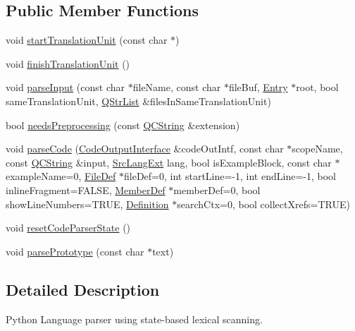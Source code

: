 \subsection*{Public Member Functions}
\begin{DoxyCompactItemize}
\item 
void \mbox{\hyperlink{class_python_language_scanner_ae67929ac5a3d38fc925157f7a5f43497}{start\+Translation\+Unit}} (const char $\ast$)
\item 
void \mbox{\hyperlink{class_python_language_scanner_a97ca623055615c143e63ea98be819f86}{finish\+Translation\+Unit}} ()
\item 
void \mbox{\hyperlink{class_python_language_scanner_a6848c585fe2a19cd36ed34540dc3fdce}{parse\+Input}} (const char $\ast$file\+Name, const char $\ast$file\+Buf, \mbox{\hyperlink{class_entry}{Entry}} $\ast$root, bool same\+Translation\+Unit, \mbox{\hyperlink{class_q_str_list}{Q\+Str\+List}} \&files\+In\+Same\+Translation\+Unit)
\item 
bool \mbox{\hyperlink{class_python_language_scanner_a7c6ce0a95e477374182374a9f5bb2e2f}{needs\+Preprocessing}} (const \mbox{\hyperlink{class_q_c_string}{Q\+C\+String}} \&extension)
\item 
void \mbox{\hyperlink{class_python_language_scanner_a0920a8f0a1fc295f0e9c240aee99012c}{parse\+Code}} (\mbox{\hyperlink{class_code_output_interface}{Code\+Output\+Interface}} \&code\+Out\+Intf, const char $\ast$scope\+Name, const \mbox{\hyperlink{class_q_c_string}{Q\+C\+String}} \&input, \mbox{\hyperlink{types_8h_a9974623ce72fc23df5d64426b9178bf2}{Src\+Lang\+Ext}} lang, bool is\+Example\+Block, const char $\ast$example\+Name=0, \mbox{\hyperlink{class_file_def}{File\+Def}} $\ast$file\+Def=0, int start\+Line=-\/1, int end\+Line=-\/1, bool inline\+Fragment=F\+A\+L\+SE, \mbox{\hyperlink{class_member_def}{Member\+Def}} $\ast$member\+Def=0, bool show\+Line\+Numbers=T\+R\+UE, \mbox{\hyperlink{class_definition}{Definition}} $\ast$search\+Ctx=0, bool collect\+Xrefs=T\+R\+UE)
\item 
void \mbox{\hyperlink{class_python_language_scanner_a7d8f587a1753e7d04dee2b5ddbc6c1df}{reset\+Code\+Parser\+State}} ()
\item 
void \mbox{\hyperlink{class_python_language_scanner_a114cb3ee5e45f0eb07829faa2868e31e}{parse\+Prototype}} (const char $\ast$text)
\end{DoxyCompactItemize}


\subsection{Detailed Description}
Python Language parser using state-\/based lexical scanning. 

